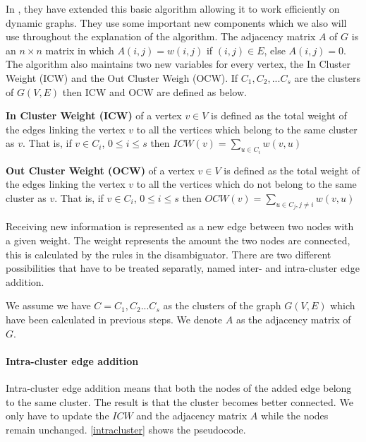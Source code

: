 In \cite{saha2006dynamic}, they have extended this basic algorithm allowing it to work efficiently on dynamic graphs. They use some important new components which we also will use throughout the explanation of the algorithm. The adjacency matrix $A$ of $G$ is an $n \times n$ matrix in which $A(i,j) = w(i,j)$ if $(i,j) \in E$, else $A(i,j) = 0$. The algorithm also maintains two new variables for every vertex, the In Cluster Weight (ICW) and the Out Cluster Weigh (OCW). If $C_1,C_2,...C_s$ are the clusters of $G(V,E)$ then ICW and OCW are defined as below.

\begin{mydef}
\textbf{In Cluster Weight (ICW)} of a vertex $v \in V$ is defined as the total weight of the edges linking the vertex $v$ to all the vertices which belong to the same cluster as $v$. That is, if $v \in C_i$, $0 \leq i \leq s$ then $ICW(v) = \sum_{u \in C_i}{w(v,u)}$
\end{mydef}

\begin{mydef}
\textbf{Out Cluster Weight (OCW)} of a vertex $v \in V$ is defined as the total weight of the edges linking the vertex $v$ to all the vertices which do not belong to the same cluster as $v$. That is, if $v \in C_i$, $0 \leq i \leq s$ then $OCW(v) = \sum_{u \in C_j, j \neq i}{w(v,u)}$
\end{mydef}

Receiving new information is represented as a new edge between two nodes with a given weight. The weight represents the amount the two nodes are connected, this is calculated by the rules in the disambiguator. There are two different possibilities that have to be treated separatly, named inter- and intra-cluster edge addition.

We assume we have $C = {C_1,C_2...C_s}$ as the clusters of the graph $G(V,E)$ which have been calculated in previous steps. We denote $A$ as the adjacency matrix of $G$.

\paragraph{Intra-cluster edge addition}

Intra-cluster edge addition means that both the nodes of the added edge belong to the same cluster. The result is that the cluster becomes better connected. We only have to update the $ICW$ and the adjacency matrix $A$ while the nodes remain unchanged. \ref{intracluster} shows the pseudocode.

